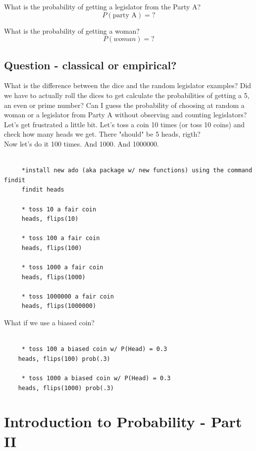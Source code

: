 \documentclass[11pt]{article}
\begin{document}
	What is the probability of getting a legislator from the Party A?
	\[P(\text{party A}) = ?\]
	
	What is the probability of getting a woman?
	\[P(woman) = ?\]

	\subsection{Question - classical or empirical?}

	What is the difference between the dice and the random legislator examples? Did we have to actually roll the dices to get calculate the probabilities of getting a 5, an even or prime number? Can I guess the probability of choosing at random a woman or a legislator from Party A without observing and counting legislators?\\

	Let's get frustrated a little bit. Let's toss a coin 10 times (or toss 10 coins) and check how many heads we get. There "should" be 5 heads, rigth?\\


	Now let's do it 100 times. And 1000. And 1000000.
	
	\begin{verbatim}

	 *install new ado (aka package w/ new functions) using the command findit
	 findit heads

	 * toss 10 a fair coin
	 heads, flips(10)

	 * toss 100 a fair coin
	 heads, flips(100)
	 
	 * toss 1000 a fair coin
	 heads, flips(1000)
	 
	 * toss 1000000 a fair coin
	 heads, flips(1000000)

	\end{verbatim}
	
	What if we use a biased coin?

	\begin{verbatim}

	 * toss 100 a biased coin w/ P(Head) = 0.3
	heads, flips(100) prob(.3)	 
	
	 * toss 1000 a biased coin w/ P(Head) = 0.3
	heads, flips(1000) prob(.3)	 

	\end{verbatim}

\pagebreak
\section{Introduction to Probability - Part II}
\end{document}

